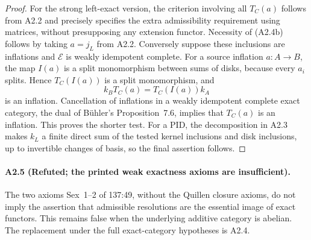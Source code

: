 \begin{proof}
For the strong left-exact version, the criterion involving all
$T_C(a)$ follows from A2.2 and precisely specifies the extra
admissibility requirement using matrices, without presupposing any
extension functor.  Necessity of (A2.4b) follows by taking $a=j_L$
from A2.2.  Conversely suppose these inclusions are inflations and
$\mathcal E$ is weakly idempotent complete.  For a source inflation
$a:A\to B$, the map $I(a)$ is a split monomorphism between sums of
disks, because every $a_i$ splits.  Hence $T_C(I(a))$ is a split
monomorphism, and
\[
 k_B T_C(a)=T_C(I(a))k_A
\]
is an inflation.  Cancellation of inflations in a weakly idempotent
complete exact category, the dual of B\"uhler's Proposition~7.6,
implies that $T_C(a)$ is an inflation.  This proves the shorter test.
For a PID, the decomposition in A2.3 makes $k_L$ a finite direct sum
of the tested kernel inclusions and disk inclusions, up to invertible
changes of basis, so the final assertion follows.
\end{proof}

\paragraph{A2.5 (Refuted; the printed weak exactness axioms are insufficient).}
\label{A2.5}
The two axioms Sex~1--2 of 137:49, without the Quillen closure axioms,
do not imply the assertion that admissible resolutions are the
essential image of exact functors.  This remains false when the
underlying additive category is abelian.  The replacement under the
full exact-category hypotheses is A2.4.

